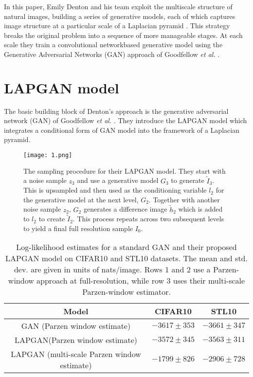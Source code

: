 \documentclass[10pt,twocolumn,letterpaper]{article}
\begin{document}
In this paper, Emily Denton and his team exploit the multiscale structure of natural images, building a series of generative models, each of which captures image structure at a particular scale of a Laplacian pyramid \cite{Denton2015Deep}. This strategy breaks the original problem into a sequence of more manageable stages. At each scale they train a convolutional networkbased generative model using the Generative Adversarial Networks (GAN) approach of Goodfellow \emph{et al.} \cite{Goodfellow2014Generative}.

\section{LAPGAN model}

The basic building block of Denton's approach is the generative adversarial network (GAN) of Goodfellow \emph{et al.} \cite{Goodfellow2014Generative}. They introduce the LAPGAN model which integrates a conditional form of GAN model into the framework of a Laplacian pyramid.

\begin{figure*}
	\begin{center}
		\texttt{[image: 1.png]}
	\end{center}
	\caption{The sampling procedure for their LAPGAN model. They start with a noise sample $z_3$ and use a generative model $G_3$ to generate $\tilde{I}_3$. This is upsampled and then used as the conditioning variable $l_2$ for the generative model at the next level, $G_2$. Together with another noise sample $z_2$, $G_2$ generates a difference image $\tilde{h}_2$ which is added to $l_2$ to create $\tilde{I}_2$. This process repeats across two subsequent levels to yield a final full resolution sample $I_0$.}
	\label{p1}
\end{figure*}

\begin{table*}
	\caption{Log-likelihood estimates for a standard GAN and their proposed LAPGAN model on CIFAR10 and STL10 datasets. The mean and std. dev. are given in units of nats/image. Rows 1 and 2 use a Parzen-window approach at full-resolution, while row 3 uses their multi-scale Parzen-window estimator.}\label{t1}
	\begin{center}
		\begin{tabular}{|c|c|c|}
			\hline
			Model & CIFAR10 & STL10 \\
			\hline \hline
			GAN \cite{Goodfellow2014Generative}(Parzen window estimate) & $-3617\pm 353$ & $-3661\pm 347$  \\
			
			LAPGAN(Parzen window estimate) & $-3572\pm 345$ & $-3563\pm 311$ \\
			
			LAPGAN (multi-scale Parzen window estimate) & $-1799\pm 826$ & $-2906\pm 728$\\
			\hline
		\end{tabular}
	\end{center}
\end{table*}
\end{document}
